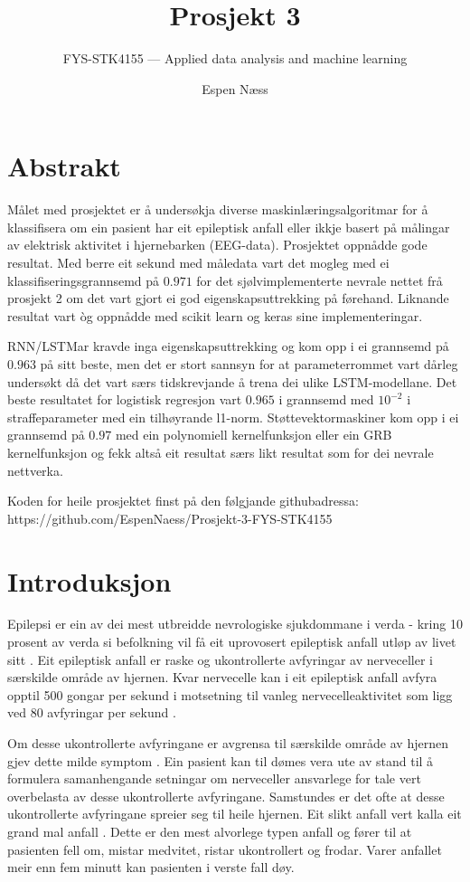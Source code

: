 \documentclass[oneside, nynorsk]{book}
\title{Prosjekt 3}        %
\subtitle{FYS-STK4155 --- Applied data analysis and machine learning}         %
\author{Espen Næss}                      %
\begin{document}
\let\cleardoublepage\clearpage
\ififorside{}
\let\cleardoublepage\clearpage
\chapter*{Abstrakt}                   %
Målet med prosjektet er å undersøkja diverse maskinlæringsalgoritmar for å klassifisera om ein pasient har eit epileptisk anfall eller ikkje
basert på målingar av elektrisk aktivitet i hjernebarken (EEG-data).
Prosjektet oppnådde gode resultat. Med berre eit sekund med måledata vart det mogleg med
ei klassifiseringsgrannsemd på $0.971$ for det sjølvimplementerte nevrale nettet frå prosjekt 2 om det vart gjort ei god eigenskapsuttrekking på førehand. Liknande resultat vart òg oppnådde med scikit learn og keras sine implementeringar.

RNN/LSTMar kravde inga eigenskapsuttrekking og kom opp i ei grannsemd på $0.963$ på sitt beste,
men det er stort sannsyn for at parameterrommet vart dårleg undersøkt då det vart særs tidskrevjande å trena dei ulike LSTM-modellane.
Det beste resultatet for logistisk regresjon vart $0.965$ i grannsemd med $10^{-2}$ i straffeparameter med ein tilhøyrande l1-norm.
Støttevektormaskiner kom opp i ei grannsemd på $0.97$ med ein polynomiell kernelfunksjon eller ein GRB kernelfunksjon og fekk altså eit resultat særs likt resultat som for dei nevrale nettverka.

Koden for heile prosjektet finst på den følgjande githubadressa: \\
https://github.com/EspenNaess/Prosjekt-3-FYS-STK4155
\tableofcontents{}
\mainmatter{}
\chapter{Introduksjon}                    %
Epilepsi er ein av dei mest utbreidde nevrologiske sjukdommane i verda - kring 10 prosent av verda si befolkning
vil få eit uprovosert epileptisk anfall utløp av livet sitt \cite{Epil}.
Eit epileptisk anfall er raske og ukontrollerte avfyringar av nerveceller i særskilde område av hjernen.
Kvar nervecelle kan i eit epileptisk anfall avfyra opptil 500 gongar per sekund
i motsetning til vanleg nervecelleaktivitet som ligg ved 80 avfyringar per sekund \cite{Epil2}.

Om desse ukontrollerte avfyringane er avgrensa til særskilde område av hjernen gjev dette milde symptom \cite{Epil3}.
Ein pasient kan til dømes vera ute av stand til å formulera samanhengande setningar om nerveceller ansvarlege for tale vert overbelasta av desse ukontrollerte avfyringane.
Samstundes er det ofte at desse ukontrollerte avfyringane spreier seg til heile hjernen.
Eit slikt anfall vert kalla eit grand mal anfall \cite{Epil3}.
Dette er den mest alvorlege typen anfall og fører til at pasienten fell om, mistar medvitet, ristar ukontrollert og frodar.
Varer anfallet meir enn fem minutt kan pasienten i verste fall døy.
\end{document}
